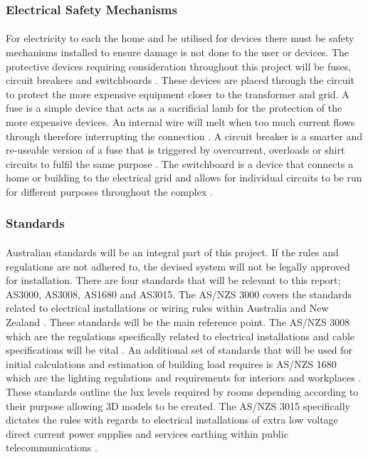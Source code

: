 \subsubsection{Electrical Safety Mechanisms}

\paragraph{}
For electricity to each the home and be utilised for devices there must be safety
mechanisms installed to ensure damage is not done to the user or devices. The protective
devices requiring consideration throughout this project will be fuses, circuit breakers
and switchboards \cite{UnitedStatesDepartmentoftheInterior2000}. These devices are placed through the circuit to protect the more expensive equipment closer to the transformer and grid. A fuse is a simple device that acts as a sacrificial lamb for the protection of the more expensive devices. An internal wire will melt when too much current flows through therefore interrupting the connection
\cite{UnitedStatesDepartmentoftheInterior2000}. A circuit breaker is a smarter and re-useable version of a fuse that is triggered by overcurrent, overloads or shirt circuits to fulfil the same purpose \cite{UnitedStatesDepartmentoftheInterior2000}. The switchboard is
a device that connects a home or building to the electrical grid and allows for individual
circuits to be run for different purposes throughout the complex \cite{UnitedStatesDepartmentoftheInterior2000}.

\subsubsection{Standards}

\paragraph{}
Australian standards will be an integral part of this project. If the rules and regulations are not adhered to, the devised system will not be legally approved for installation. There are four standards that will be relevant to this report; AS3000, AS3008, AS1680 and AS3015. The AS/NZS 3000 covers the standards related to electrical installations or wiring rules within Australia and New Zealand \cite{StandardsAustralia2007}. These standards will be the main reference point. The AS/NZS 3008 which are the regulations specifically related to electrical installations and cable specifications will be vital \cite{StandardsAustralia2010}. An additional set of standards that will be used for initial calculations and estimation of building load requires is AS/NZS 1680 which are the lighting regulations and requirements for interiors and workplaces \cite{StandardsAustralia2006}. These standards outline the lux levels required by rooms depending according to their purpose allowing 3D models to be created. The AS/NZS 3015 specifically dictates the rules with regards to electrical installations of extra low voltage direct current power supplies and services earthing within public telecommunications \cite{StandardsAustralia2004}.     

